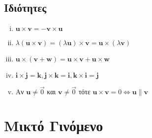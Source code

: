 {  \subsection*{Ιδιότητες}

  \begin{enumerate}[i)]
    \item $ \mathbf{u} \times \mathbf{v} = - \mathbf{v} \times \mathbf{u} $
    \item $ \lambda (\mathbf{u} \times \mathbf{v}) = (\lambda \mathbf{u}) \times \mathbf{v}
      = \mathbf{u} \times (\lambda \mathbf{v}) $ 
    \item $ \mathbf{u} \times (\mathbf{v}+ \mathbf{w}) = \mathbf{u} \times \mathbf{v}+ 
      \mathbf{u} \times \mathbf{w} $
    \item $ \mathbf{i} \times \mathbf{j} = \mathbf{k}, \mathbf{j} \times \mathbf{k} =
      \mathbf{i}, \mathbf{k} \times \mathbf{i} = \mathbf{j} $
    \item Αν $ \mathbf{u} \neq \vec{0} $ και $ \mathbf{v} \neq \vec{0} $ τότε 
      $ \mathbf{u} \times \mathbf{v}= 0 \Leftrightarrow \mathbf{u} \parallel \mathbf{v} $ 
  \end{enumerate}
}


\section*{Μικτό Γινόμενο}

